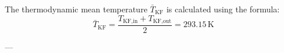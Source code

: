The thermodynamic mean temperature \( \bar{T}_{\text{KF}} \) is calculated using the formula:  
\[
\bar{T}_{\text{KF}} = \frac{T_{\text{KF,in}} + T_{\text{KF,out}}}{2} = 293.15 \, \text{K}
\]  

---